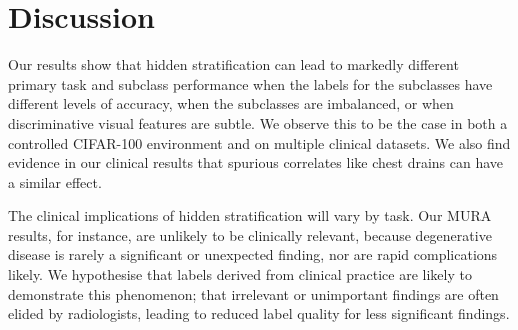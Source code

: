 \documentclass{article}
\begin{document}
%

\section{Discussion}

Our results show that hidden stratification can lead to markedly different primary task and subclass performance when the labels for the subclasses have different levels of accuracy, when the subclasses are imbalanced, or when discriminative visual features are subtle.
We observe this to be the case in both a controlled CIFAR-100 environment and on multiple clinical datasets.
We also find evidence in our clinical results that spurious correlates like chest drains can have a similar effect.

The clinical implications of hidden stratification will vary by task. 
Our MURA results, for instance, are unlikely to be clinically relevant, because degenerative disease is rarely a significant or unexpected finding, nor are rapid complications likely. 
We hypothesise that labels derived from clinical practice are likely to demonstrate this phenomenon; that irrelevant or unimportant findings are often elided by radiologists, leading to reduced label quality for less significant findings.
\end{document}
